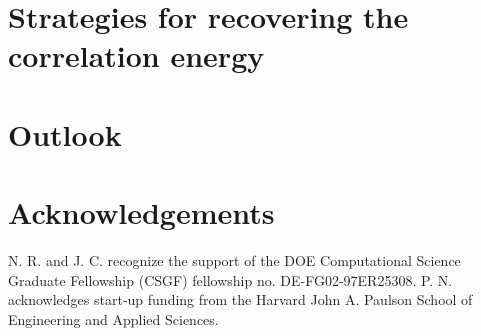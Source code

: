 \documentclass[aps,prb,twocolumn,
	groupedaddress,superscriptaddress,
	amsfonts,amssymb,amsmath,floatfix,
	citeautoscript]{revtex4-1}
\begin{document}
\section{Strategies for recovering the correlation energy}

\section{Outlook}



\section{Acknowledgements}
N. R. and J. C. recognize the support of the DOE Computational Science Graduate Fellowship (CSGF) fellowship no.  DE-FG02-97ER25308. P. N. acknowledges start-up funding from the Harvard John A. Paulson School of Engineering and Applied Sciences. %



\end{document}
